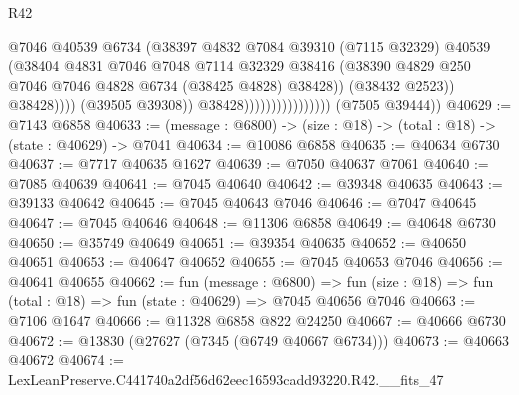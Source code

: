\begin{lexlean}{R42}
\begin{coremodule}
{                                                @7046
                                                @40539
                                                @6734
                                                (@38397
                                                  @4832
                                                  @7084
                                                  @39310
                                                  (@7115 @32329)
                                                  @40539
                                                  (@38404
                                                    @4831
                                                    @7046
                                                    @7048
                                                    @7114
                                                    @32329
                                                    @38416
                                                    (@38390
                                                      @4829
                                                      @250
                                                      @7046
                                                      @7046
                                                      @4828
                                                      @6734
                                                      (@38425 @4828)
                                                      @38428))
                                                  (@38432 @2523))
                                                @38428))))
                                        (@39505 @39308))
                                      @38428))))))))))))))))
      (@7505 @39444))
@40629 := @7143 @6858
@40633 := (message : @6800) -> (size : @18) -> (total : @18) -> (state : @40629) -> @7041
@40634 := @10086 @6858
@40635 := @40634 @6730
@40637 := @7717 @40635 @1627
@40639 := @7050 @40637 @7061
@40640 := @7085 @40639
@40641 := @7045 @40640
@40642 := @39348 @40635
@40643 := @39133 @40642
@40645 := @7045 @40643 @7046
@40646 := @7047 @40645
@40647 := @7045 @40646
@40648 := @11306 @6858
@40649 := @40648 @6730
@40650 := @35749 @40649
@40651 := @39354 @40635
@40652 := @40650 @40651
@40653 := @40647 @40652
@40655 := @7045 @40653 @7046
@40656 := @40641 @40655
@40662 := fun (message : @6800) =>
  fun (size : @18) => fun (total : @18) => fun (state : @40629) => @7045 @40656 @7046
@40663 := @7106 @1647
@40666 := @11328 @6858 @822 @24250
@40667 := @40666 @6730
@40672 := @13830 (@27627 (@7345 (@6749 @40667 @6734)))
@40673 := @40663 @40672
@40674 := LexLeanPreserve.C441740a2df56d62eec16593cadd93220.R42.__fits_47
}
\end{coremodule}
\end{lexlean}
